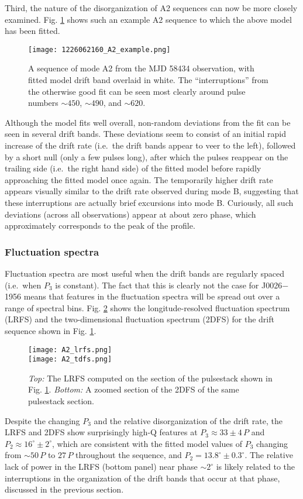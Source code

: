 \documentclass[twocolumn]{aastex631}
\newcommand{\psr}{J0026$-$1956}
\begin{document}
Third, the nature of the disorganization of A2 sequences can now be more closely examined.
Fig. \ref{fig:A2_example} shows such an example A2 sequence to which the above model has been fitted.
\begin{figure}[!th]
    \centering
    \texttt{[image: 1226062160\_A2\_example.png]}
    \caption{A sequence of mode A2 from the MJD 58434 observation, with fitted model drift band overlaid in white. The ``interruptions'' from the otherwise good fit can be seen most clearly around pulse numbers $\sim450$, $\sim490$, and $\sim620$.}
    \label{fig:A2_example}
\end{figure}
Although the model fits well overall, non-random deviations from the fit can be seen in several drift bands.
These deviations seem to consist of an initial rapid increase of the drift rate (i.e.\ the drift bands appear to veer to the left), followed by a short null (only a few pulses long), after which the pulses reappear on the trailing side (i.e.\ the right hand side) of the fitted model before rapidly approaching the fitted model once again.
The temporarily higher drift rate appears visually similar to the drift rate observed during mode B, suggesting that these interruptions are actually brief excursions into mode B.
Curiously, all such deviations (across all observations) appear at about zero phase, which approximately corresponds to the peak of the profile.


\subsubsection{Fluctuation spectra}

Fluctuation spectra are most useful when the drift bands are regularly spaced (i.e.\ when $P_3$ is constant).
The fact that this is clearly not the case for \psr{} means that features in the fluctuation spectra will be spread out over a range of spectral bins.
Fig. \ref{fig:lrfs} shows the longitude-resolved fluctuation spectrum (LRFS) and the two-dimensional fluctuation spectrum (2DFS) for the drift sequence shown in Fig. \ref{fig:A2_example}.
\begin{figure}[t]
    \centering
    \texttt{[image: A2\_lrfs.png]} \\
    \texttt{[image: A2\_tdfs.png]}
    \caption{\textit{Top:} The LRFS computed on the section of the pulsestack shown in Fig. \ref{fig:A2_example}. \textit{Bottom:} A zoomed section of the 2DFS of the same pulsestack section.}
    \label{fig:lrfs}
\end{figure}
Despite the changing $P_3$ and the relative disorganization of the drift rate, the LRFS and 2DFS show surprisingly high-Q features at $P_3 \approx 33 \pm 4\,P$ and $P_2 \approx 16^\circ \pm 2^\circ$, which are consistent with the fitted model values of $P_3$ changing from $\sim50\,P$ to $27\,P$ throughout the sequence, and $P_2 = 13.8^\circ \pm 0.3^\circ$.
The relative lack of power in the LRFS (bottom panel) near phase $\sim2^\circ$ is likely related to the interruptions in the organization of the drift bands that occur at that phase, discussed in the previous section.
\end{document}
